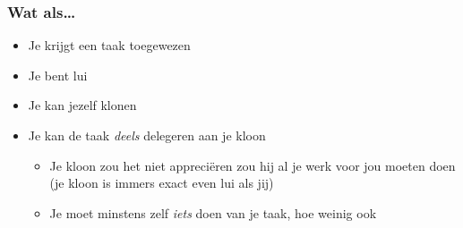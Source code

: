 \begin{frame}[plain]
\end{frame}

\begin{frame}
  \frametitle{Wat als\dots}
  \begin{itemize}
    \item Je krijgt een taak toegewezen
    \item Je bent lui
    \item Je kan jezelf klonen
    \item Je kan de taak \emph{deels} delegeren aan je kloon
          \begin{itemize}
            \item Je kloon zou het niet appreci\"eren zou hij al je werk voor jou moeten doen (je kloon is immers exact even lui als jij)
            \item Je moet minstens zelf \emph{iets} doen van je taak, hoe weinig ook
          \end{itemize}
  \end{itemize}
\end{frame}

